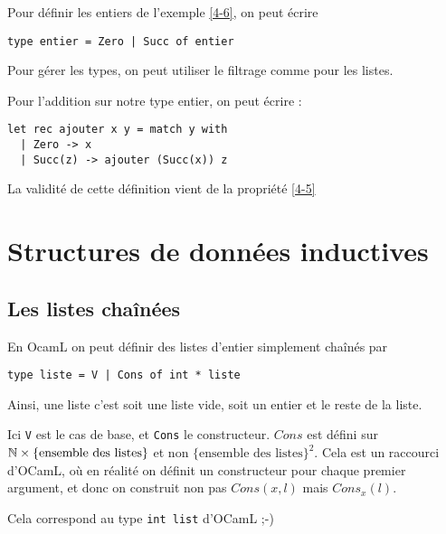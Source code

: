 \begin{example}
	Pour définir les entiers de l'exemple \ref{4-6}, on peut écrire \begin{lstlisting}
type entier = Zero | Succ of entier
	\end{lstlisting}
\end{example}

\begin{syntaxe}
	Pour gérer les types, on peut utiliser le filtrage comme pour les listes.
\end{syntaxe}

\begin{example}
	Pour l'addition sur notre type entier, on peut écrire :
	\begin{lstlisting}
let rec ajouter x y = match y with
  | Zero -> x
  | Succ(z) -> ajouter (Succ(x)) z
	\end{lstlisting}
\end{example}

\begin{example}
	La validité de cette définition vient de la propriété \ref{4-5}
\end{example}

\section{Structures de données inductives}

\subsection{Les listes chaînées}


En OcamL on peut définir des listes d'entier simplement chaînés par \begin{lstlisting}
type liste = V | Cons of int * liste
\end{lstlisting}

Ainsi, une liste c'est soit une liste vide, soit un entier et le reste de la liste.

\begin{rem}
	Ici \texttt V est le cas de base, et \texttt{Cons} le constructeur. $Cons$ est défini sur $\mathbb{N} \times \{\text{ensemble des listes}\}$ et non $\{\text{ensemble des listes}\}^2$. Cela est un raccourci d'OCamL, où en réalité on définit un constructeur pour chaque premier argument, et donc on construit non pas $Cons(x, l)$ mais $Cons_x(l)$.
\end{rem}

\begin{rem}
	Cela correspond au type \texttt{int list} d'OCamL ;-)
\end{rem}

